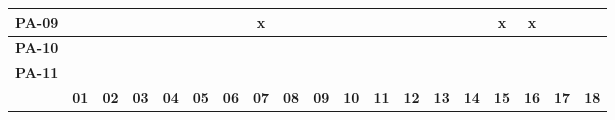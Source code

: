 \begin{table}[H]
{\begin{tabular}{|c|c|c|c|c|c|c|c|c|c|c|c|c|c|c|c|c|c|c|}
			\textbf{PA-09} &             &             &             &             &             &             & x           &             &             &             &             &             &             &             & x           & x           &             &             \\ \hline
			\textbf{PA-10} &             &             &             &             &             &             &             &             &             &             &             &             &             &             &             &             &             &             \\ \hline
			\textbf{PA-11} &             &             &             &             &             &             &             &             &             &             &             &             &             &             &             &             &             &             \\ \hline
			\textbf{}      & \textbf{01} & \textbf{02} & \textbf{03} & \textbf{04} & \textbf{05} & \textbf{06} & \textbf{07} & \textbf{08} & \textbf{09} & \textbf{10} & \textbf{11} & \textbf{12} & \textbf{13} & \textbf{14} & \textbf{15} & \textbf{16} & \textbf{17} & \textbf{18} \\ \hline
	\end{tabular}}
\end{table}

